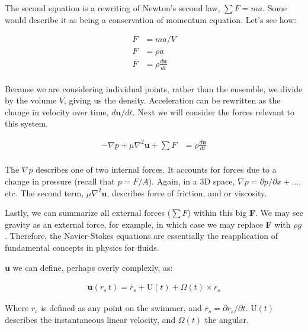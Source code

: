 \documentclass[12pt]{report}
\begin{document}
The second equation is a rewriting of Newton's second law, $\sum F = ma$. Some would describe it as being a conservation of momentum equation. Let's see how: 

\begin{equation} \label{NSderive1}
\begin{split}
F & = ma / V \\
F & = \rho a \\
F & = \rho \frac{d\mathbf{u}}{dt} \\
\end{split}
\end{equation}

Because we are considering individual points, rather than the ensemble, we divide by the volume $V$, giving us the density. Acceleration can be rewritten as the change in velocity over time, $d\mathbf{u} / dt$. Next we will consider the forces relevant to this system. 

\begin{equation} \label{NSderive2}
\begin{split}
-\nabla p + \mu \nabla^2\mathbf{u} + \sum F & = \rho \frac{d\mathbf{u}}{dt} \\
\end{split}
\end{equation}

The $\nabla p$ describes one of two internal forces. It accounts for forces due to a change in pressure (recall that $p = F/A$). Again, in a 3D space, $\nabla p = \partial p / \partial x + ... $, etc. The second term, $\mu \nabla^2\mathbf{u}$, describes force of friction, and or viscosity.\newline

Lastly, we can summarize all external forces ($\sum F$) within this big \textbf{F}. We may see gravity as an external force, for example, in which case we may replace \textbf{F} with $\rho g$. Therefore, the Navier-Stokes equations are essentially the reapplication of fundamental concepts in physics for fluids.\newline

\textbf{u} we can define, perhaps overly complexly, as:

\begin{equation} \label{NS3}
\begin{split}
\mathbf{u}(r_s\,t) = \dot{r_s} + \mathrm{U}(t) + \Omega(t)\times r_s
\end{split}
\end{equation}

Where $r_s$ is defined as any point on the swimmer, and $\dot{r_s} = \partial r_s / \partial t$. $\mathrm{U}(t)$ describes the instantaneous linear velocity, and $\Omega(t)$ the angular.\newline
\end{document}
